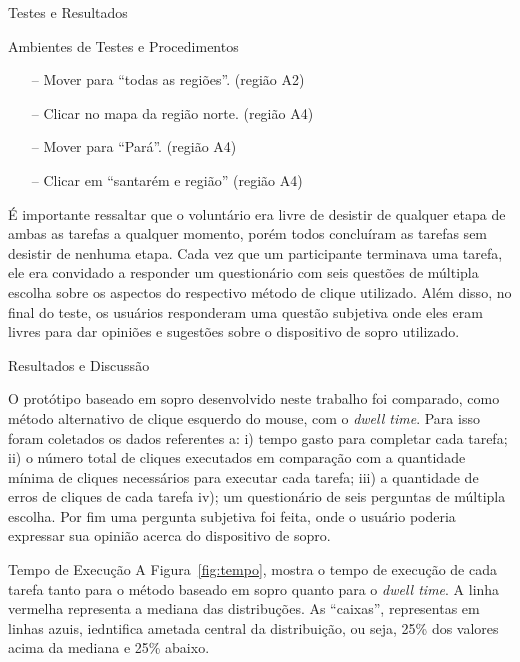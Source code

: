 \begin{chapter}{Testes e Resultados}
\begin{section}{Ambientes de Testes e Procedimentos}
\begin{itemize}
\begin{itemize}
\begin{itemize}
		\item[--] Mover para ``todas as regiões''.                       \hfill(região A2)
		\item[--] Clicar no mapa da região norte.                        \hfill(região A4)
		\item[--] Mover para ``Pará''.                                   \hfill(região A4)
		\item[--] Clicar em ``santarém e região''                        \hfill(região A4)
		\end{itemize}
	\end{itemize}
\end{itemize}

É importante ressaltar que o voluntário era livre de desistir de qualquer etapa
de ambas as tarefas a qualquer momento, porém todos concluíram as tarefas sem
desistir de nenhuma etapa. Cada vez que um participante terminava uma tarefa,
ele era convidado a responder um questionário com seis questões de múltipla
escolha sobre os aspectos do respectivo método de clique utilizado. Além disso,
no final do teste, os usuários responderam uma questão subjetiva onde eles eram
livres para dar opiniões e sugestões sobre o dispositivo de sopro utilizado.
\end{section}

\begin{section}{Resultados e Discussão}

O protótipo baseado em sopro desenvolvido neste trabalho foi comparado, como
método alternativo de clique esquerdo do mouse, com o \textit{dwell time}. Para
isso foram coletados os dados referentes a: i) tempo gasto para completar cada
tarefa; ii) o número total de cliques executados em comparação com a quantidade
mínima de cliques necessários para executar cada tarefa; iii) a quantidade de
erros de cliques de cada tarefa iv); um questionário de seis perguntas de
múltipla escolha. Por fim uma pergunta subjetiva foi feita, onde o usuário
poderia expressar sua opinião acerca do dispositivo de sopro.

\begin{subsection}{Tempo de Execução}
A Figura~\ref{fig:tempo}, mostra o tempo de execução de cada tarefa tanto para o
método baseado em sopro quanto para o \textit{dwell time}. A linha vermelha
representa a mediana das distribuções. As ``caixas'', representas em linhas
azuis, iedntifica  ametada central da distribuição, ou seja, 25\% dos valores
acima da mediana e 25\% abaixo.


\end{subsection}
\end{section}
\end{chapter}

